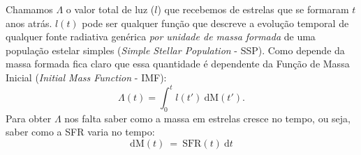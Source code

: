 Chamamos $\Lambda$ o valor total de luz ($l$) que recebemos de estrelas que se formaram $t$ anos
atrás. $l(t)$ pode ser qualquer função que descreve a evolução temporal de qualquer fonte radiativa
genérica \emph{por unidade de massa formada} de uma população estelar simples ({\em Simple Stellar
Population} - SSP). Como depende da massa formada fica claro que essa quantidade é dependente da
Função de Massa Inicial ({\em Initial Mass Function} - IMF):
\begin{equation}
	\Lambda(t) = \int_0^t l(t')\ \textrm{d}\textrm{M}(t').
	\label{eq:dLambda}
\end{equation}
\noindent Para obter $\Lambda$ nos falta saber como a massa em estrelas cresce no tempo, ou seja,
saber como a SFR varia no tempo:
\begin{equation}
	\mathrm{d}\mathrm{M}(t)\ =\ \mathrm{SFR}(t)\ \mathrm{d}t
	\label{eq:dM_t}
\end{equation}

